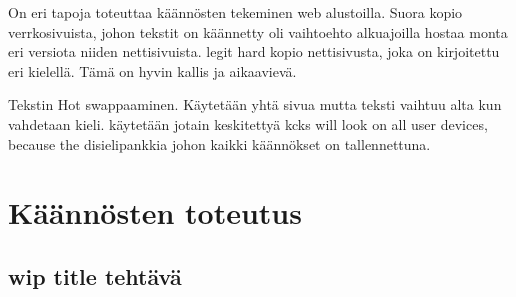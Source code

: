 \documentclass[11pt,a4paper,titlepage,oneside]{article}
\begin{document}







On eri tapoja toteuttaa käännösten tekeminen web alustoilla. 
Suora kopio verrkosivuista, johon tekstit on käännetty oli vaihtoehto alkuajoilla
hostaa monta eri versiota niiden nettisivuista.
legit hard kopio nettisivusta, joka on kirjoitettu eri kielellä. Tämä on hyvin kallis ja aikaavievä.

Tekstin Hot swappaaminen. Käytetään yhtä sivua mutta teksti vaihtuu alta kun vahdetaan kieli. \citemissing{}
käytetään jotain keskitettyä kcks will look on all user devices, because the disielipankkia johon kaikki käännökset on tallennettuna.
\medskip

































\newpage






\section{Käännösten toteutus}

\subsection{wip title tehtävä}
\end{document}
